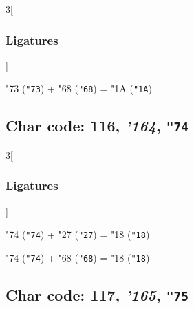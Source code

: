 \documentclass{article}
\newlength{\maxcharwidth}
\begin{document}
\begin{multicols}{3}[\subsubsection{Ligatures}]

{\testfont\char"73\noboundary} ({\tt"73}) + {\testfont\char"68\noboundary} ({\tt"68}) = {\testfont\char"1A\noboundary} ({\tt"1A}) 

\end{multicols}

\subsection{Char code: 116, {\it'164}, {\tt"74}}
\label{char_116}


\begin{multicols}{3}[\subsubsection{Ligatures}]

{\testfont\char"74\noboundary} ({\tt"74}) + {\testfont\char"27\noboundary} ({\tt"27}) = {\testfont\char"18\noboundary} ({\tt"18}) 

{\testfont\char"74\noboundary} ({\tt"74}) + {\testfont\char"68\noboundary} ({\tt"68}) = {\testfont\char"18\noboundary} ({\tt"18}) 

\end{multicols}

\subsection{Char code: 117, {\it'165}, {\tt"75}}
\label{char_117}

\end{document}
